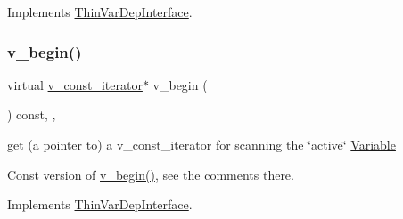 Implements \mbox{\hyperlink{group___thin_var_dep_interface___c_l_a_s_s_e_s_ga645ab1f1a40dea7fdcef536081c78613}{Thin\+Var\+Dep\+Interface}}.

\mbox{\label{class_s_m_spp__di__unipi__it_1_1_f_real_objective_a997de10fbae309ac6e357d7ad96a8052}} 
\subsubsection{\texorpdfstring{v\+\_\+begin()}{v\_begin()}\hspace{0.1cm}{\footnotesize\ttfamily [2/2]}}
{\footnotesize\ttfamily virtual \mbox{\hyperlink{class_s_m_spp__di__unipi__it_1_1_thin_var_dep_interface_1_1v__const__iterator}{v\+\_\+const\+\_\+iterator}}$\ast$ v\+\_\+begin (\begin{DoxyParamCaption}\item[{void}]{ }\end{DoxyParamCaption}) const\hspace{0.3cm}{\ttfamily [inline]}, {\ttfamily [override]}, {\ttfamily [virtual]}}



get (a pointer to) a v\+\_\+const\+\_\+iterator for scanning the \char`\"{}active\char`\"{} \mbox{\hyperlink{class_s_m_spp__di__unipi__it_1_1_variable}{Variable}} 

Const version of \mbox{\hyperlink{class_s_m_spp__di__unipi__it_1_1_f_real_objective_ad0b5bcf42a678385fdba6fe41ce9626b}{v\+\_\+begin()}}, see the comments there. 

Implements \mbox{\hyperlink{group___thin_var_dep_interface___c_l_a_s_s_e_s_ga6179496ecb66b6cc1504a50bcbb264e9}{Thin\+Var\+Dep\+Interface}}.

\mbox{\label{class_s_m_spp__di__unipi__it_1_1_f_real_objective_ad17303c6335cb94a9d32f1fce77501fd}} 
